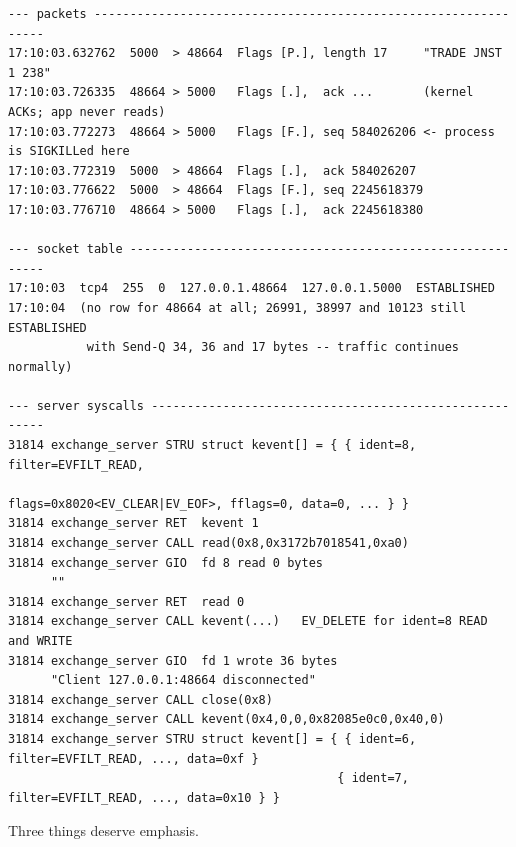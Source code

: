 \documentclass[11pt,a4paper]{article}
\begin{document}
\begin{lstlisting}
--- packets ---------------------------------------------------------------
17:10:03.632762  5000  > 48664  Flags [P.], length 17     "TRADE JNST 1 238"
17:10:03.726335  48664 > 5000   Flags [.],  ack ...       (kernel ACKs; app never reads)
17:10:03.772273  48664 > 5000   Flags [F.], seq 584026206 <- process is SIGKILLed here
17:10:03.772319  5000  > 48664  Flags [.],  ack 584026207
17:10:03.776622  5000  > 48664  Flags [F.], seq 2245618379
17:10:03.776710  48664 > 5000   Flags [.],  ack 2245618380

--- socket table ----------------------------------------------------------
17:10:03  tcp4  255  0  127.0.0.1.48664  127.0.0.1.5000  ESTABLISHED
17:10:04  (no row for 48664 at all; 26991, 38997 and 10123 still ESTABLISHED
           with Send-Q 34, 36 and 17 bytes -- traffic continues normally)

--- server syscalls -------------------------------------------------------
31814 exchange_server STRU struct kevent[] = { { ident=8, filter=EVFILT_READ,
                                                 flags=0x8020<EV_CLEAR|EV_EOF>, fflags=0, data=0, ... } }
31814 exchange_server RET  kevent 1
31814 exchange_server CALL read(0x8,0x3172b7018541,0xa0)
31814 exchange_server GIO  fd 8 read 0 bytes
      ""
31814 exchange_server RET  read 0
31814 exchange_server CALL kevent(...)   EV_DELETE for ident=8 READ and WRITE
31814 exchange_server GIO  fd 1 wrote 36 bytes
      "Client 127.0.0.1:48664 disconnected"
31814 exchange_server CALL close(0x8)
31814 exchange_server CALL kevent(0x4,0,0,0x82085e0c0,0x40,0)
31814 exchange_server STRU struct kevent[] = { { ident=6, filter=EVFILT_READ, ..., data=0xf }
                                              { ident=7, filter=EVFILT_READ, ..., data=0x10 } }
\end{lstlisting}

Three things deserve emphasis.
\end{document}
